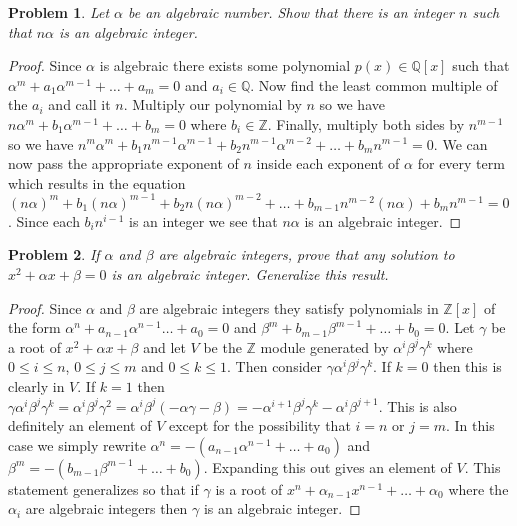 \documentclass{article}
\newtheorem{problem}{Problem}
\begin{document}
\begin{problem}
Let $\alpha$ be an algebraic number. Show that there is an integer $n$ such that $n \alpha$ is an algebraic integer.
\end{problem}
\begin{proof}
Since $\alpha$ is algebraic there exists some polynomial $p(x) \in \mathbb{Q}[x]$ such that $\alpha^m + a_1 \alpha^{m-1} + \dots + a_m = 0$ and $a_i \in \mathbb{Q}$. Now find the least common multiple of the $a_i$ and call it $n$. Multiply our polynomial by $n$ so we have $n \alpha^m + b_1 \alpha^{m-1} + \dots + b_m = 0$ where $b_i \in \mathbb{Z}$. Finally, multiply both sides by $n^{m-1}$ so we have $n^m \alpha^m + b_1 n^{m-1} \alpha^{m-1} + b_2 n^{m-1} \alpha^{m-2} + \dots + b_m n^{m-1} = 0$. We can now pass the appropriate exponent of $n$ inside each exponent of $\alpha$ for every term which results in the equation $(n \alpha)^m + b_1 (n \alpha)^{m-1} + b_2 n (n \alpha)^{m-2} + \dots + b_{m-1} n^{m-2} (n \alpha) + b_m n^{m-1} = 0$. Since each $b_i n^{i-1}$ is an integer we see that $n \alpha$ is an algebraic integer.
\end{proof}

\begin{problem}
If $\alpha$ and $\beta$ are algebraic integers, prove that any solution to $x^2 + \alpha x + \beta = 0$ is an algebraic integer. Generalize this result.
\end{problem}
\begin{proof}
Since $\alpha$ and $\beta$ are algebraic integers they satisfy polynomials in $\mathbb{Z}[x]$ of the form $\alpha^n + a_{n-1} \alpha^{n-1} \dots + a_0 = 0$ and $\beta^m + b_{m-1} \beta^{m-1} + \dots + b_0 = 0$. Let $\gamma$ be a root of $x^2 + \alpha x + \beta$ and let $V$ be the $\mathbb{Z}$ module generated by $\alpha^i \beta^j \gamma^k$ where $0 \leq i \leq n$, $0 \leq j \leq m$ and $0 \leq k \leq 1$. Then consider $\gamma \alpha^i \beta^j \gamma^k$. If $k = 0$ then this is clearly in $V$. If $k = 1$ then $\gamma \alpha^i \beta^j \gamma^k = \alpha^i \beta^j \gamma^2 = \alpha^i \beta^j (-\alpha \gamma - \beta) = -\alpha^{i+1} \beta^j \gamma^k - \alpha^i \beta^{j+1}$. This is also definitely an element of $V$ except for the possibility that $i = n$ or $j = m$. In this case we simply rewrite $\alpha^n = -(a_{n-1} \alpha^{n-1} + \dots + a_0)$ and $\beta^m = -(b_{m-1} \beta^{m-1} + \dots + b_0)$. Expanding this out gives an element of $V$. This statement generalizes so that if $\gamma$ is a root of $x^n + \alpha_{n-1} x^{n-1} + \dots + \alpha_0$ where the $\alpha_i$ are algebraic integers then $\gamma$ is an algebraic integer.
\end{proof}
\end{document}
